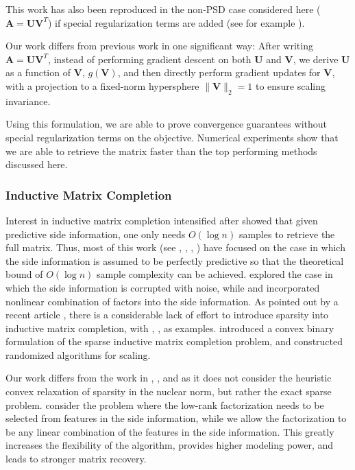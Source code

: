 \documentclass[twoside,11pt]{article}
\begin{document}
This work has also been reproduced in the non-PSD case considered here ($\bm{A}=\bm{U}\bm{V}^T$) if special regularization terms are added (see for example \cite{sun2016guaranteed}).

Our work differs from previous work in one significant way: After writing $\bm{A}=\bm{U}\bm{V}^T$, instead of performing gradient descent on both $\bm{U}$ and $\bm{V}$, we derive $\bm{U}$ as a function of $\bm{V}$, $g(\bm{V})$, and then directly perform gradient updates for $\bm{V}$, with a projection to a fixed-norm hypersphere $\|\bm{V}\|_2=1$ to ensure scaling invariance. 

Using this formulation, we are able to prove convergence guarantees without special regularization terms on the objective. Numerical experiments show that we are able to retrieve the matrix  faster  than the top performing methods discussed here.

\subsubsection*{Inductive Matrix Completion}
Interest in inductive matrix completion intensified after \cite{xuspeedup} showed that given predictive side information, one only needs $O(\log n)$ samples to retrieve the full matrix. 
Thus, most of this work (see \cite{xuspeedup}, \cite{jain2013provable}, \cite{farhat2013genomic},  \cite{natarajan2014inductive}) have focused on the case in which the side information is assumed to be perfectly predictive so that the theoretical bound of $O(\log n)$ sample complexity \cite{xuspeedup} can be achieved. 
 \cite{chiang2015matrix} explored the case in which the side information is corrupted with noise, while \cite{shah2017matrix} and \cite{si2016goal} incorporated nonlinear combination of factors into the side information. As pointed out by a recent article \cite{nazarov2018sparse}, there is a considerable lack of effort to introduce sparsity into inductive matrix completion, with \cite{lu2016sparse}, \cite{soni2016noisy}, \cite{nazarov2018sparse} as examples.  \cite{bertsimas2018interpretable}  introduced a convex binary formulation of the sparse inductive matrix completion problem, and constructed randomized algorithms for scaling.
 
 Our work differs from the work  in \cite{lu2016sparse}, \cite{soni2016noisy}, and \cite{nazarov2018sparse}  as it does not consider the heuristic convex relaxation of sparsity in the nuclear norm, but rather the exact sparse problem. \cite{bertsimas2018interpretable} consider the problem where the low-rank factorization needs to be selected from features in the side information, while we allow the factorization to be any linear combination of the features in the side information. 
  This greatly increases the flexibility of the algorithm, provides higher  modeling power, and leads to stronger matrix recovery.
\end{document}
